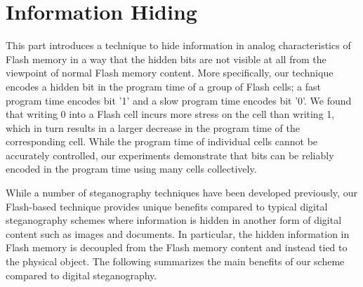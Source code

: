 \section{Information Hiding}

This part introduces a technique to hide information in analog characteristics 
of Flash memory in a way that the hidden bits are not visible at all from the viewpoint of normal 
Flash memory content. More specifically, our technique encodes a hidden bit in the program
time of a group of Flash cells; a fast program time encodes bit '1' and a slow program time 
encodes bit '0'. We found that writing 0 into a Flash cell incurs more 
stress on the cell than writing 1, which in turn results in a larger decrease in
the program time of the corresponding cell. While the program time of individual cells cannot
be accurately controlled, our experiments demonstrate that bits can be reliably encoded
in the program time using many cells collectively.


While a number of steganography techniques have been developed previously, our
Flash-based technique provides unique benefits compared to typical digital
steganography schemes where information is hidden in another form of digital content such 
as images and documents. In particular, the hidden information in Flash memory is
decoupled from the Flash memory content and instead tied to the physical object.
The following summarizes the main benefits of our scheme compared to
digital steganography.

